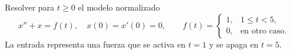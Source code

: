 Resolver para \(t\ge0\) el modelo normalizado
\[x''+x=f(t),\quad x(0)=x'(0)=0,\qquad
f(t)=\begin{cases}1,&1\le t<5,\\0,&\text{en otro caso}.\end{cases}\]
La entrada representa una fuerza que se activa en \(t=1\) y se apaga en \(t=5\).
